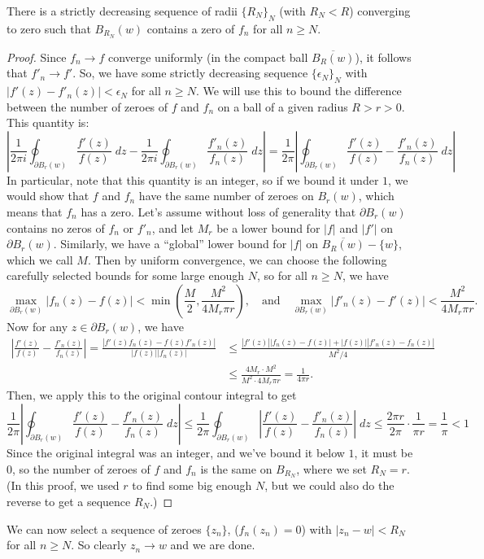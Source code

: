 \documentclass{pset}
\begin{document}
\begin{solution}
  \begin{claim}
    There is a strictly decreasing sequence of radii $\{R_N\}_N$ (with $R_N<R$) converging to zero such that $B_{R_N}(w)$ contains a zero of $f_n$ for all $n\geq N$.
  \end{claim}
  \begin{proof}
    Since $f_n\to f$ converge uniformly (in the compact ball $\overline{B_R(w)}$), it follows that $f'_n \to f'$. 
    So, we have some strictly decreasing sequence $\{\epsilon_N\}_N$ with $|f'(z)-f'_n(z)| < \epsilon_N$ for all $n\geq N$. We will use this to bound the difference between the number of zeroes of $f$ and $f_n$ on a ball of a given radius $R>r>0$. This quantity is:
    \[
      \left|\frac{1}{2\pi i}\oint_{\partial B_r(w)} \frac{f'(z)}{f(z)}\;dz - \frac{1}{2\pi i}\oint_{\partial B_r(w)} \frac{f'_n(z)}{f_n(z)}\;dz\right| = 
      \frac{1}{2\pi}\left|
      \oint_{\partial B_r(w)} \frac{f'(z)}{f(z)}-\frac{f'_n(z)}{f_n(z)}\;dz
      \right|
    \]
    In particular, note that this quantity is an integer, so if we bound it under $1$, we would show that $f$ and $f_n$ have the same number of zeroes on $B_r(w)$, which means that $f_n$ has a zero. Let's assume without loss of generality that $\partial B_r(w)$ contains no zeros of $f_n$ or $f'_n$, and let $M_r$ be a lower bound for $|f|$ and $|f'|$ on $\partial B_r(w)$.
    Similarly, we have a ``global'' lower bound for $|f|$ on $\overline{B_R(w)}-\{w\}$, which we call $M$. 
    Then by uniform convergence, we can choose the following carefully selected bounds for some large enough $N$, so for all $n\geq N$, we have
    \[
      \max_{\partial B_r(w)} |f_n(z) - f(z)| < \min\left(\frac{M}{2}, \frac{M^2}{4 M_r \pi r}\right),\quad\textrm{and}\quad \max_{\partial B_r(w)} |f'_n(z)-f'(z)| < \frac{M^2}{4 M_r \pi r}.
    \]
    Now for any $z\in \partial B_r(w)$, we have
    \[\begin{aligned}
      \left|\frac{f'(z)}{f(z)} - \frac{f'_n(z)}{f_n(z)}\right| = \frac{|f'(z)f_n(z) - f(z)f'_n(z)|}{|f(z)||f_n(z)|} &\leq \frac{|f'(z)||f_n(z)-f(z)| + |f(z)||f'_n(z)-f_n(z)|}{M^2 /4} \\&\leq \frac{4M_r\cdot M^2}{M^2\cdot 4 M_r\pi r} = \frac{1}{4\pi r}.
    \end{aligned}\]
    Then, we apply this to the original contour integral to get 
    \[
    \frac{1}{2\pi}\left|
    \oint_{\partial B_r(w)} \frac{f'(z)}{f(z)}-\frac{f'_n(z)}{f_n(z)}\;dz\right| \leq \frac{1}{2\pi}\oint_{\partial B_r(w)}\left|\frac{f'(z)}{f(z)}-\frac{f'_n(z)}{f_n(z)}\right|\;dz \leq \frac{2\pi r}{2\pi}\cdot \frac{1}{\pi r} = \frac{1}{\pi}<1
    \]
    Since the original integral was an integer, and we've bound it below $1$, it must be $0$, so the number of zeroes of $f$ and $f_n$ is the same on $B_{R_N}$, where we set $R_N = r$. (In this proof, we used $r$ to find some big enough $N$, but we could also do the reverse to get a sequence $R_N$.)
  \end{proof}

  We can now select a sequence of zeroes $\{z_n\}$, ($f_n(z_n) = 0$) with $|z_n - w| < R_N$ for all $n\geq N$. So clearly $z_n \to w$ and we are done.
\end{solution}
\end{document}
